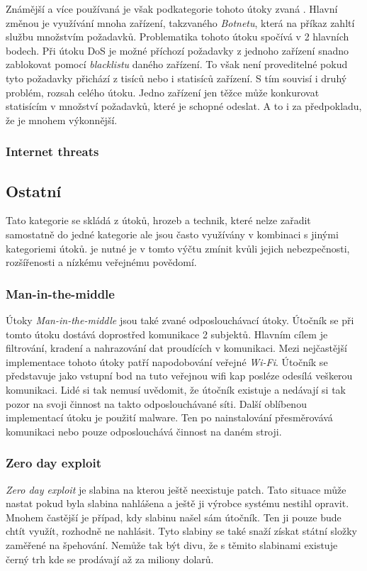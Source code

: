 Známější a více používaná je však podkategorie tohoto útoky zvaná .
Hlavní změnou je využívání mnoha zařízení, takzvaného \textit{Botnetu}, která na příkaz zahltí službu množstvím požadavků.
Problematika tohoto útoku spočívá v 2 hlavních bodech.
Při útoku \ac{DoS} je možné příchozí požadavky z jednoho zařízení snadno zablokovat pomocí \textit{blacklistu} daného zařízení.
To však není proveditelné pokud tyto požadavky přichází z tisíců nebo i statisíců zařízení.
S tím souvisí i druhý problém, rozsah celého útoku.
Jedno zařízení jen těžce může konkurovat statisícím v množství požadavků, které je schopné odeslat.
A to i za předpokladu, že je mnohem výkonnější.

\subsubsection{Internet threats}


\subsection{Ostatní}
Tato kategorie se skládá z útoků, hrozeb a technik, které nelze zařadit samostatně do jedné kategorie ale jsou často využívány v kombinaci s jinými kategoriemi útoků.
je nutné je v tomto výčtu zmínit kvůli jejich nebezpečnosti, rozšířenosti a nízkému veřejnému povědomí.

\subsubsection{Man-in-the-middle}
Útoky \textit{Man-in-the-middle} jsou také zvané odposlouchávací útoky.
Útočník se při tomto útoku dostává doprostřed komunikace 2 subjektů.
Hlavním cílem je filtrování, kradení a nahrazování dat proudících v komunikaci.
Mezi nejčastější implementace tohoto útoky patří napodobování veřejné \textit{Wi-Fi}.
Útočník se představuje jako vstupní bod na tuto veřejnou wifi kap posléze odesílá veškerou komunikaci.
Lidé si tak nemusí uvědomit, že útočník existuje a nedávají si tak pozor na svoji činnost na takto odposlouchávané síti.
Další oblíbenou implementací útoku je použití malware.
Ten po nainstalování přesměrovává komunikaci nebo pouze odposlouchává činnost na daném stroji.\cite{cisco_most_common_attack}

\subsubsection{Zero day exploit}
\textit{Zero day exploit} je slabina na kterou ještě neexistuje patch.
Tato situace může nastat pokud byla slabina nahlášena a ještě ji výrobce systému nestihl opravit.
Mnohem častější je případ, kdy slabinu našel sám útočník.
Ten ji pouze bude chtít využít, rozhodně ne nahlásit.
Tyto slabiny se také snaží získat státní složky zaměřené na špehování.
Nemůže tak být divu, že s těmito slabinami existuje černý trh\cite{world_end_2021} kde se prodávají až za miliony dolarů.

